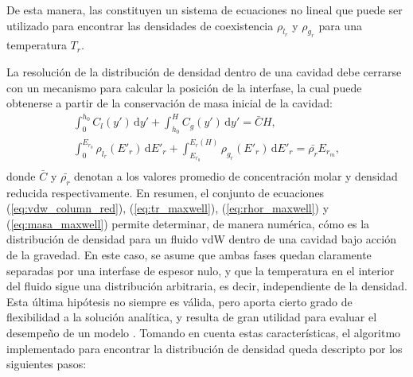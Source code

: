 De esta manera, las  constituyen un sistema de ecuaciones no lineal que puede ser utilizado para encontrar las densidades de coexistencia $\rho_{l_r}$ y $\rho_{g_r}$ para una temperatura $T_r$.

La resoluci\'on de la distribuci\'on de densidad dentro de una cavidad debe cerrarse con un mecanismo para calcular la posici\'on de la interfase, la cual puede obtenerse a partir de la conservaci\'on de masa inicial de la cavidad:
\begin{equation}
	\begin{gathered}
		\int_{0}^{h_0} C_l(y') \, \mbox{d}y' + \int_{h_0}^{H} C_g(y') \, \mbox{d}y' = \bar{C}H ,\\[3mm]
		\int_{0}^{E_{r_0}} \rho_{l_r} (E'_r) \, \mbox{d}E'_r + \int_{E_{r_0}}^{E_r(H)} \rho_{g_r}(E'_r) \, \mbox{d}E'_r = \bar{\rho_r}E_{r_m}, \\
	\end{gathered}
	\label{eq:masa_maxwell}
\end{equation}
donde $\bar{C}$ y $\bar{\rho_r}$ denotan a los valores promedio de concentraci\'on molar y densidad reducida respectivamente. En resumen, el conjunto de ecuaciones (\ref{eq:vdw_column_red}), (\ref{eq:tr_maxwell}), (\ref{eq:rhor_maxwell}) y (\ref{eq:masa_maxwell}) permite determinar, de manera num\'erica, c\'omo es la distribuci\'on de densidad para un fluido vdW dentro de una cavidad  bajo acci\'on de la gravedad. En este caso, se asume que ambas fases quedan claramente separadas por una interfase de espesor nulo, y que la temperatura en el interior del fluido sigue una distribuci\'on arbitraria, es decir, independiente de la densidad.  Esta \'ultima hip\'otesis no siempre es v\'alida, pero aporta cierto grado de flexibilidad a la soluci\'on anal\'itica, y resulta de gran utilidad para evaluar el desempe\~no de un modelo \pp{}. Tomando en cuenta estas caracter\'isticas, el algoritmo implementado para encontrar la distribuci\'on de densidad queda descripto por los siguientes pasos:


